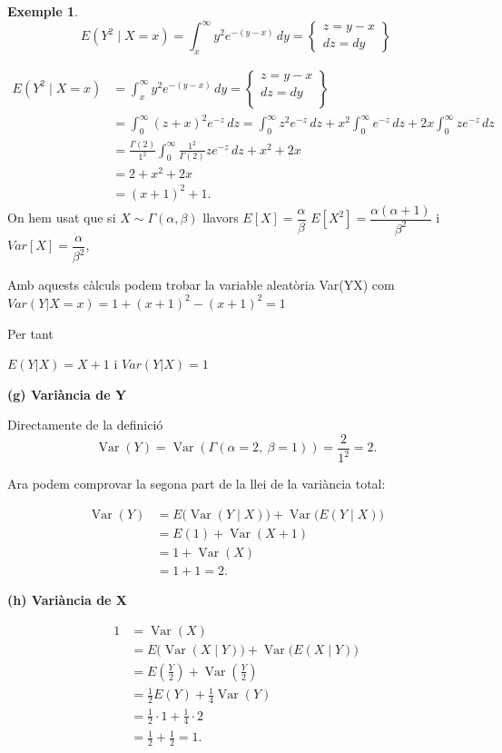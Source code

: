 \documentclass[
  catalan,
]{article}
\theoremstyle{definition}
\theoremstyle{definition}
\newtheorem{example}{Exemple}[section]
\theoremstyle{definition}
\theoremstyle{definition}
\theoremstyle{remark}
\begin{document}
\begin{example}
\[
E(Y^2\mid X=x)
=
\int_x^\infty y^2e^{-(y-x)}\,dy
=
\left\{
\begin{array}{ll}
z=y-x\\
dz=dy
\end{array}
\right\}
\]

\[
\begin{aligned}
E(Y^2\mid X=x)&=\int_x^\infty y^2e^{-(y-x)}\,dy =
\left\{
\begin{aligned}
z=y-x \\
dz=dy \\
\end{aligned}
\right\} \\
&= \int_{0}^{\infty}(z+x)^2e^{-z}\,dz 
= \int_{0}^{\infty}z^2e^{-z}\,dz
   + x^2\int_{0}^{\infty}e^{-z}\,dz
   + 2x\int_{0}^{\infty}ze^{-z}\,dz \\
&= \frac{\Gamma(2)}{1^2}\int_{0}^{\infty}
   \frac{1^2}{\Gamma(2)}ze^{-z}\,dz
   + x^2 + 2x \\
&= 2 + x^2 + 2x \\
&= (x+1)^2+1.
\end{aligned}
\]
On hem usat que si \(X\sim\Gamma(\alpha,\beta)\) llavors \(E[X]=\dfrac {\alpha}{\beta}\) \(E[X^2]=\dfrac {\alpha(\alpha+1)}{\beta^2}\) i \(Var[X]=\dfrac {\alpha}{\beta^2}\),

Amb aquests càlculs podem trobar la variable aleatòria Var(Y\textbar X) com
\(Var(Y|X=x) =1+(x+1)^2-(x+1)^2=1\)

Per tant

\(E(Y|X)=X+1\) i \(Var(Y|X)=1\)

\textbf{(g) Variància de Y}

Directamente de la definició
\[
\operatorname{Var}(Y) = \operatorname{Var}(\Gamma(\alpha = 2,\ \beta = 1))
= \frac{2}{1^2} = 2.
\]

Ara podem comprovar la segona part de la llei de la variància total:

\[
\begin{aligned}
\operatorname{Var}(Y)
&= E\bigl(\operatorname{Var}(Y \mid X)\bigr)
   + \operatorname{Var}\bigl(E(Y \mid X)\bigr) \\
&= E(1) + \operatorname{Var}(X + 1) \\
&= 1 + \operatorname{Var}(X) \\
&= 1 + 1 = 2.
\end{aligned}
\]

\textbf{(h) Variància de X}

\[
\begin{aligned}
1
&= \operatorname{Var}(X) \\
&= E\bigl(\operatorname{Var}(X \mid Y)\bigr)
   + \operatorname{Var}\bigl(E(X \mid Y)\bigr) \\
&= E\left(\frac{Y}{2}\right)
   + \operatorname{Var}\left(\frac{Y}{2}\right) \\
&= \frac{1}{2}E(Y)
   + \frac{1}{4}\operatorname{Var}(Y) \\
&= \frac{1}{2}\cdot 1
   + \frac{1}{4}\cdot 2 \\
&= \frac{1}{2} + \frac{1}{2} = 1.
\end{aligned}
\]
\end{example}
\end{document}

